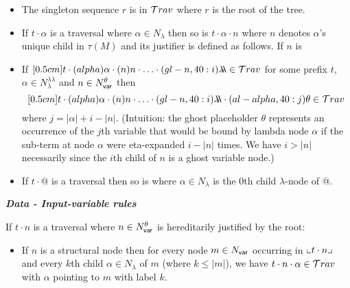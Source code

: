 \documentclass{article}
\theoremstyle{definition}
\newcommand\Nodes{N}%
\newcommand\NodesVar{N_{\sf var}}%
\newcommand\NodesLmd{N_\lambda}%
\newcommand{\ghostlmd}{{\lambda\!\!\lambda}}
\newcommand{\ghostvar}{\theta}
\begin{document}
\begin{FramedTable}
\begin{itemize}[]
\item{} The singleton sequence $r$ is in $\mathcal{T}rav$ where $r$ is the root of the tree.
\end{itemize}

\begin{itemize}[]
    \item {} If $t \cdot \alpha$ is a traversal where $\alpha\in\NodesLmd$ then so is
        $t \cdot \alpha \cdot n$ where $n$
        denotes $\alpha$'s unique child in $\tau(M)$ and its justifier is defined as follows. If $n$ is
    \item \rulenamet{Lam^\ghostlmd} If
  $\Pstr[0.5cm]{ t \cdot(alpha){\alpha} \cdot
(n){n} \cdot \ldots \cdot
(gl-n,40:i){\ghostlmd} \in\travset}$ for some prefix $t$, $\alpha \in \NodesLmd^\ghostlmd$ and $n \in\NodesVar^\ghostvar$ then
$$\Pstr[0.5cm]{ t \cdot(alpha){\alpha} \cdot
(n){n}
\cdot \ldots \cdot
(gl-n,40:i){\ghostlmd}\cdot (al-alpha,40:j){\ghostvar}
      \in\travset}$$
 where $j = |\alpha| + i - |n|$. (Intuition: the ghost placeholder $\ghostvar$ represents an occurrence of the $j$th variable that would be bound by lambda node $\alpha$ if the sub-term at node $\alpha$ were eta-expanded $i-|n|$ times.
 We have $i>|n|$ necessarily since the $i$th child of $n$ is a ghost variable node.)


    \item {} If $t \cdot @$ is a traversal then so is  where $\alpha\in\NodesLmd$ is the $0$th child $\lambda$-node of $@$.
\end{itemize}

\emph{\bf Data - Input-variable rules}

If $t \cdot n$ is a traversal where $n \in \NodesVar^\ghostvar$ is hereditarily justified by the root:
\begin{itemize}[]
\item {} If $n$ is a structural node then
for every node $m \in \NodesVar$ occurring in $\llcorner t\cdot n \lrcorner$
and every $k$th child $\alpha \in \Nodes_\lambda$ of $m$ (where $k\leq|m|$),
we have $t \cdot n \cdot \alpha \in \mathcal{T}rav$ with $\alpha$ pointing to $m$ with label $k$.


\end{itemize}
\end{FramedTable}
\end{document}
